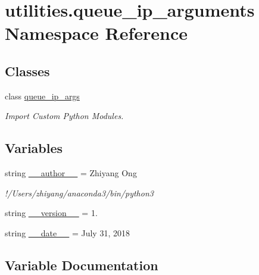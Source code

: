 \hypertarget{namespaceutilities_1_1queue__ip__arguments}{}\section{utilities.\+queue\+\_\+ip\+\_\+arguments Namespace Reference}
\label{namespaceutilities_1_1queue__ip__arguments}
\subsection*{Classes}
\begin{DoxyCompactItemize}
\item 
class \hyperlink{classutilities_1_1queue__ip__arguments_1_1queue__ip__args}{queue\+\_\+ip\+\_\+args}
\begin{DoxyCompactList}\small\item\em Import Custom Python Modules. \end{DoxyCompactList}\end{DoxyCompactItemize}
\subsection*{Variables}
\begin{DoxyCompactItemize}
\item 
string \hyperlink{namespaceutilities_1_1queue__ip__arguments_adc999d785e9803ef585833d4c1ae53e4}{\+\_\+\+\_\+author\+\_\+\+\_\+} = \textquotesingle{}Zhiyang Ong\textquotesingle{}
\begin{DoxyCompactList}\small\item\em !/\+Users/zhiyang/anaconda3/bin/python3 \end{DoxyCompactList}\item 
string \hyperlink{namespaceutilities_1_1queue__ip__arguments_aac0867ebe34eaed5fb081f33e4ac9740}{\+\_\+\+\_\+version\+\_\+\+\_\+} = \textquotesingle{}1.\textquotesingle{}
\item 
string \hyperlink{namespaceutilities_1_1queue__ip__arguments_a43f24226d75dbc13271de84f469f6944}{\+\_\+\+\_\+date\+\_\+\+\_\+} = \textquotesingle{}July 31, 2018\textquotesingle{}
\end{DoxyCompactItemize}


\subsection{Variable Documentation}
\hypertarget{namespaceutilities_1_1queue__ip__arguments_adc999d785e9803ef585833d4c1ae53e4}{}
